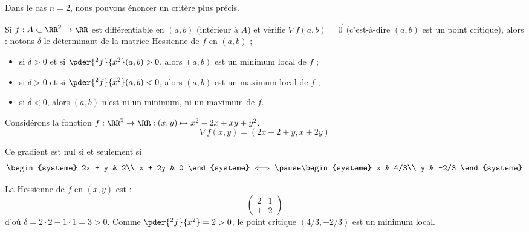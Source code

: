 \begin{frame}
  Dans le cas \(n = 2\), nous pouvons énoncer un critère plus précis.\pause{}
  \begin{proposition} Si \(f : A \subset \RR^{2}\to\RR\) est différentiable en \((a,b)\)\pause{} (intérieur à \(A\))\pause{} et vérifie \(\nabla f{(a,b)} = \vec 0\)\pause{} (c'est-à-dire \((a,b)\) est un point critique)\pause{}, alors :\pause{} notons \(\delta\) le déterminant de la matrice Hessienne de \(f\) en \((a,b)\) ;\pause{}
    \begin{itemize}
    \item si \(\delta > 0\)\pause{} et si \(\pder {^{2}f}{x^{2}} (a,b) > 0\),\pause{} alors \((a,b)\) est un minimum local de \(f\) ;\pause{}
    \item si \(\delta > 0\)\pause{} et si \(\pder {^{2}f}{x^{2}} (a,b) < 0\),\pause{} alors \((a,b)\) est un maximum local de \(f\) ;\pause{}
    \item si \(\delta < 0\),\pause{} alors \((a,b)\) n'est ni un minimum, ni un maximum de \(f\).
    \end{itemize}
  \end{proposition}\pause{}
\end{frame}
\begin{frame}
  \begin{example}
    Considérons la fonction \(f : \RR^2 \to \RR : (x,y) \mapsto x^{2} -2x + xy + y^{2}\).\pause{}
    \begin{equation*}
      \nabla f(x,y) = (2x-2+y,x + 2y)
    \end{equation*}\pause{}

    Ce gradient est nul si et seulement si
    \begin{equation*}
      \begin{systeme}
        2x + y & 2\\
        x + 2y & 0
      \end{systeme}
      \iff\pause
      \begin{systeme}
        x & 4/3\\
        y & -2/3
      \end{systeme}
    \end{equation*}\pause

    La Hessienne de \(f\) en \((x,y)\) est :\pause{}
    \begin{equation*}
      \begin{pmatrix}
        2 & 1\\
        1 & 2
      \end{pmatrix}
    \end{equation*}\pause{}
    d'où \(\delta = 2\cdot2 - 1 \cdot 1 = 3 > 0\).\pause{} Comme \(\pder {^{2}f}{x^{2}} = 2 > 0\),\pause{} le point critique \((4/3,-2/3)\)\pause{} est un minimum local.
  \end{example}
\end{frame}
  
